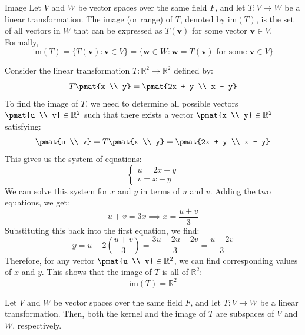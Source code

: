 \documentclass[openany]{book}
\begin{document}
\begin{mydefinition}{Image}
    Let $V$ and $W$ be vector spaces over the same field $F$, and let $T: V \to W$ be a linear transformation. The image (or range) of $T$, denoted by $\text{im}(T)$, is the set of all vectors in $W$ that can be expressed as $T(\mathbf{v})$ for some vector $\mathbf{v} \in V$. Formally,
    $$\text{im}(T) = \{T(\mathbf{v}) : \mathbf{v} \in V\} = \{\mathbf{w} \in W : \mathbf{w} = T(\mathbf{v}) \text{ for some } \mathbf{v} \in V\}$$
\end{mydefinition}
\begin{example}
    Consider the linear transformation $T: \mathbb{R}^2 \to \mathbb{R}^2$ defined by:
    $$T\pmat{x \\ y} = \pmat{2x + y \\ x - y}$$
    To find the image of $T$, we need to determine all possible vectors $\pmat{u \\ v} \in \mathbb{R}^2$ such that there exists a vector $\pmat{x \\ y} \in \mathbb{R}^2$ satisfying:
    $$\pmat{u \\ v} = T\pmat{x \\ y} = \pmat{2x + y \\ x - y}$$
    This gives us the system of equations:
    \[
    \begin{cases}
    u = 2x + y \\
    v = x - y
    \end{cases}
    \]
    We can solve this system for $x$ and $y$ in terms of $u$ and $v$. Adding the two equations, we get:
    $$u + v = 3x \implies x = \frac{u + v}{3}$$
    Substituting this back into the first equation, we find:
    $$y = u - 2\left(\frac{u + v}{3}\right) = \frac{3u - 2u - 2v}{3} = \frac{u - 2v}{3}$$
    Therefore, for any vector $\pmat{u \\ v} \in \mathbb{R}^2$, we can find corresponding values of $x$ and $y$. This shows that the image of $T$ is all of $\mathbb{R}^2$:
    $$\text{im}(T) = \mathbb{R}^2$$
\end{example}
\begin{mytheorem}
    Let $V$ and $W$ be vector spaces over the same field $F$, and let $T: V \to W$ be a linear transformation. Then, both the kernel and the image of $T$ are subspaces of $V$ and $W$, respectively.
\end{mytheorem} 
\end{document}
